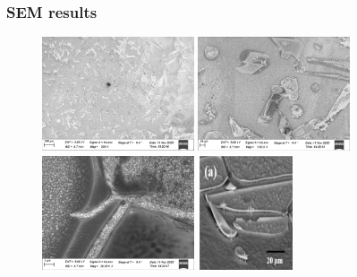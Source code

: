 \documentclass{beamer}
\begin{document}
\begin{frame}
	\frametitle[center]{SEM results}
	\begin{figure}
		\includegraphics[width=0.4\textwidth]{Images/r1_sem_200.png}
		\includegraphics[width=0.4\textwidth]{Images/r1_sem_1k.png}
		\includegraphics[width=0.4\textwidth]{Images/r1_sem_20k.png}
		\includegraphics[width=0.25\textwidth]{Images/cracks20_single.png}
	\end{figure}
\end{frame}
\end{document}
